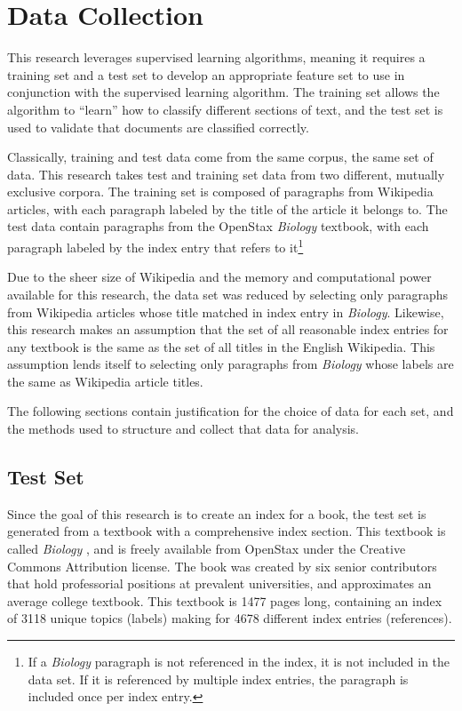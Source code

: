 \section{Data Collection}
\label{sec:data-collection}

This research leverages supervised learning algorithms, meaning it requires a training set and a test set to develop an appropriate feature set to use in conjunction with the supervised learning algorithm.
The training set allows the algorithm to ``learn'' how to classify different sections of text, and the test set is used to validate that documents are classified correctly.

Classically, training and test data come from the same corpus, the same set of data\cite{jurafsky}.
This research takes test and training set data from two different, mutually exclusive corpora.
The training set is composed of paragraphs from Wikipedia articles, with each paragraph labeled by the title of the article it belongs to.
The test data contain paragraphs from the OpenStax {\it Biology} textbook\cite{biology}, with each paragraph labeled by the index entry that refers to it\footnote{If a {\it Biology} paragraph is not referenced in the index, it is not included in the data set. If it is referenced by multiple index entries, the paragraph is included once per index entry.}

Due to the sheer size of Wikipedia and the memory and computational power available for this research, the data set was reduced by selecting only paragraphs from Wikipedia articles whose title matched in index entry in {\it Biology}.
Likewise, this research makes an assumption that the set of all reasonable index entries for any textbook is the same as the set of all titles in the English Wikipedia.
This assumption lends itself to selecting only paragraphs from {\it Biology} whose labels are the same as Wikipedia article titles.

The following sections contain justification for the choice of data for each set, and the methods used to structure and collect that data for analysis.

\subsection{Test Set}
\label{subsec:test-set}

Since the goal of this research is to create an index for a book, the test set is generated from a textbook with a comprehensive index section.
This textbook is called {\it Biology} \cite{biology}, and is freely available from OpenStax \cite{openstax-bio} under the Creative Commons Attribution license.
The book was created by six senior contributors that hold professorial positions at prevalent universities, and approximates an average college textbook.
This textbook is 1477 pages long, containing an index of 3118 unique topics (labels) making for 4678 different index entries (references).

